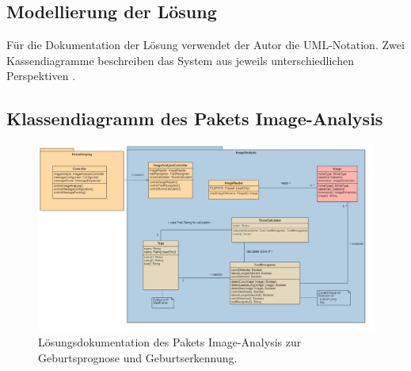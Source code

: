  






\begin{landscape}

\section{Modellierung der Lösung}
Für die Dokumentation der Lösung verwendet der Autor die UML-Notation. Zwei Kassendiagramme beschreiben das System aus jeweils unterschiedlichen Perspektiven \cite{Uml-modellierung2012}. 

\subsection{Klassendiagramm des Pakets Image-Analysis }
\begin{figure}[H]
	\center
	\includegraphics[scale=0.45]{Grafiken/modelle/solution-imageanalysis.jpg}
	\caption{Lösungsdokumentation des Pakets Image-Analysis zur Geburtsprognose und Geburtserkennung.} 
	\label{fig: Lösungsdokumentation des Pakets Image-Analysis zur Geburtsprognose und Geburtserkennung.}
\end{figure}


\end{landscape}
